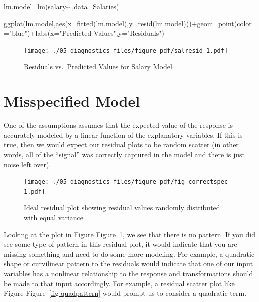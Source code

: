 \documentclass[
  letterpaper,
  DIV=11,
  numbers=noendperiod]{scrreprt}
\newenvironment{Shaded}{\begin{snugshade}}{\end{snugshade}}
\newcommand{\AttributeTok}[1]{\textcolor[rgb]{0.40,0.45,0.13}{#1}}
\newcommand{\FunctionTok}[1]{\textcolor[rgb]{0.28,0.35,0.67}{#1}}
\newcommand{\NormalTok}[1]{\textcolor[rgb]{0.00,0.23,0.31}{#1}}
\newcommand{\OtherTok}[1]{\textcolor[rgb]{0.00,0.23,0.31}{#1}}
\newcommand{\SpecialCharTok}[1]{\textcolor[rgb]{0.37,0.37,0.37}{#1}}
\newcommand{\StringTok}[1]{\textcolor[rgb]{0.13,0.47,0.30}{#1}}
\begin{document}
\begin{Shaded}
\begin{Highlighting}[]
\NormalTok{lm.model}\OtherTok{=}\FunctionTok{lm}\NormalTok{(salary}\SpecialCharTok{\textasciitilde{}}\NormalTok{.,}\AttributeTok{data=}\NormalTok{Salaries)}

\FunctionTok{ggplot}\NormalTok{(lm.model,}\FunctionTok{aes}\NormalTok{(}\AttributeTok{x=}\FunctionTok{fitted}\NormalTok{(lm.model),}\AttributeTok{y=}\FunctionTok{resid}\NormalTok{(lm.model)))}\SpecialCharTok{+}\FunctionTok{geom\_point}\NormalTok{(}\AttributeTok{color=}\StringTok{"blue"}\NormalTok{)}\SpecialCharTok{+}\FunctionTok{labs}\NormalTok{(}\AttributeTok{x=}\StringTok{"Predicted Values"}\NormalTok{,}\AttributeTok{y=}\StringTok{"Residuals"}\NormalTok{)}
\end{Highlighting}
\end{Shaded}

\begin{figure}[H]

{\centering \texttt{[image: ./05-diagnostics\_files/figure-pdf/salresid-1.pdf]}

}

\caption{Residuals vs.~Predicted Values for Salary Model}

\end{figure}

\hypertarget{misspecified-model}{%
\section{Misspecified Model}\label{misspecified-model}}

One of the assumptions assumes that the expected value of the response
is accurately modeled by a linear function of the explanatory variables.
If this is true, then we would expect our residual plots to be random
scatter (in other words, all of the ``signal'' was correctly captured in
the model and there is just noise left over).

\begin{figure}

{\centering \texttt{[image: ./05-diagnostics\_files/figure-pdf/fig-correctspec-1.pdf]}

}

\caption{\label{fig-correctspec}Ideal residual plot showing residual
values randomly distributed with equal variance}

\end{figure}

Looking at the plot in Figure Figure~\ref{fig-correctspec}, we see that
there is no pattern. If you did see some type of pattern in this
residual plot, it would indicate that you are missing something and need
to do some more modeling. For example, a quadratic shape or curvilinear
pattern to the residuals would indicate that one of our input variables
has a nonlinear relationship to the response and transformations should
be made to that input accordingly. For example, a residual scatter plot
like Figure Figure~\ref{fig-quadpattern} would prompt us to consider a
quadratic term.
\end{document}
